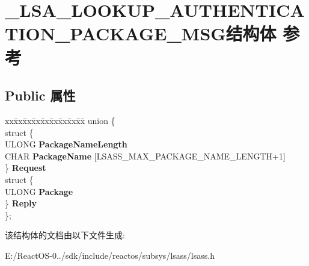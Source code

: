 \hypertarget{struct___l_s_a___l_o_o_k_u_p___a_u_t_h_e_n_t_i_c_a_t_i_o_n___p_a_c_k_a_g_e___m_s_g}{}\section{\+\_\+\+L\+S\+A\+\_\+\+L\+O\+O\+K\+U\+P\+\_\+\+A\+U\+T\+H\+E\+N\+T\+I\+C\+A\+T\+I\+O\+N\+\_\+\+P\+A\+C\+K\+A\+G\+E\+\_\+\+M\+S\+G结构体 参考}
\label{struct___l_s_a___l_o_o_k_u_p___a_u_t_h_e_n_t_i_c_a_t_i_o_n___p_a_c_k_a_g_e___m_s_g}
\subsection*{Public 属性}
\begin{DoxyCompactItemize}
\item 
\mbox{\label{struct___l_s_a___l_o_o_k_u_p___a_u_t_h_e_n_t_i_c_a_t_i_o_n___p_a_c_k_a_g_e___m_s_g_a3c545829af11b14320065b0eeeed357d}} 
\begin{tabbing}
xx\=xx\=xx\=xx\=xx\=xx\=xx\=xx\=xx\=\kill
union \{\\
\>struct \{\\
\>\>ULONG {\bfseries PackageNameLength}\\
\>\>CHAR {\bfseries PackageName} \mbox{[}LSASS\_MAX\_PACKAGE\_NAME\_LENGTH+1\mbox{]}\\
\>\} {\bfseries Request}\\
\>struct \{\\
\>\>ULONG {\bfseries Package}\\
\>\} {\bfseries Reply}\\
\}; \\

\end{tabbing}\end{DoxyCompactItemize}


该结构体的文档由以下文件生成\+:\begin{DoxyCompactItemize}
\item 
E\+:/\+React\+O\+S-\/0../sdk/include/reactos/subsys/lsass/lsass.\+h\end{DoxyCompactItemize}
